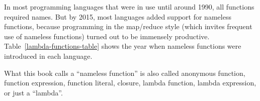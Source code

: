 In most programming languages that were in use until around 1990,
all functions required names. But by 2015, most languages added support
for nameless functions, because programming in the map/reduce style
(which invites frequent use of nameless functions) turned out to be
immensely productive. Table\ \ref{lambda-functions-table} shows
the year when nameless functions were introduced in each language.

What this book calls a ``nameless function'' is also called anonymous
function, function expression, function literal, closure, lambda function,
lambda expression, or just a ``lambda''.
